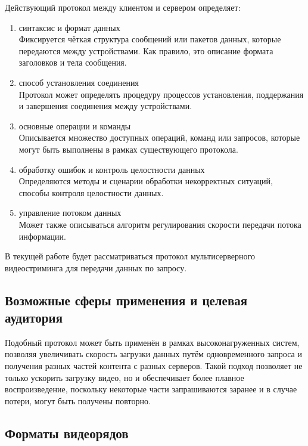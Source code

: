 Действующий протокол между клиентом и сервером определяет:
\begin{enumerate}
	\item синтаксис и формат данных \\
	Фиксируется чёткая структура сообщений или пакетов данных, которые передаются между устройствами. Как правило, это описание формата заголовков и тела сообщения.
	
	\item способ установления соединения \\
	Протокол может определять процедуру процессов установления, поддержания и завершения соединения между устройствами. 
	
	\item основные операции и команды \\
	Описывается множество доступных операций, команд или запросов, которые могут быть выполнены в рамках существующего протокола. 
	
	\item обработку ошибок и контроль целостности данных \\
	Определяются методы и сценарии обработки некорректных ситуаций, способы контроля целостности данных.
	
	\item управление потоком данных \\
	Может также описываться алгоритм регулирования скорости передачи потока информации.
\end{enumerate}

В текущей работе будет рассматриваться протокол мультисерверного видеостриминга для передачи данных по запросу. \\

\subsection{Возможные сферы применения и целевая аудитория}
Подобный протокол может быть применён в рамках высоконагруженных систем, позволяя увеличивать скорость загрузки данных путём одновременного запроса и получения разных частей контента с разных серверов. Такой подход позволяет не только ускорить загрузку видео, но и обеспечивает более плавное воспроизведение, поскольку некоторые части запрашиваются заранее и в случае потери, могут быть получены повторно. 



\subsection{Форматы видеорядов}




